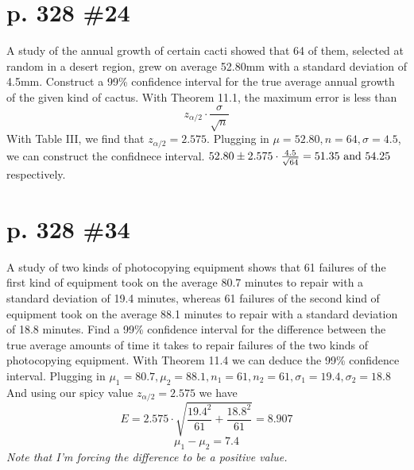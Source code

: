 \documentclass[12pt]{article}
\begin{document}
	\section[20pt]{p. 328 \#24}
	A study of the annual growth of certain cacti showed that 64 of them, selected at random in a desert region, grew on average 52.80mm with a standard deviation of 4.5mm. Construct a 99\% confidence interval for the true average annual growth of the given kind of cactus.
	\newline \newline
	With Theorem 11.1, the maximum error is less than
	\[z_{\alpha/2}\cdot \frac{\sigma}{\sqrt{n}}\]
	With Table III, we find that \(z_{\alpha/2} = 2.575\).
	\newline
	Plugging in \(\mu = 52.80, n = 64, \sigma = 4.5\), we can construct the confidnece interval.
	\(52.80 \pm 2.575\cdot \frac{4.5}{\sqrt{64}} = 51.35 \textup{ and } 54.25\) respectively.
	\newline \newline
	\newpage
	\section[20pt]{p. 328 \#34}
	A study of two kinds of photocopying equipment shows that 61 failures of the first kind of equipment took on the average 80.7 minutes to repair with a standard deviation of 19.4 minutes, whereas 61 failures of the second kind of equipment took on the average 88.1 minutes to repair with a standard deviation of 18.8 minutes. Find a 99\% confidence interval for the difference between the true average amounts of time it takes to repair failures of the two kinds of photocopying equipment.
	\newline \newline
	With Theorem 11.4 we can deduce the 99\% confidence interval.
	\newline
	Plugging in \(\mu_1 = 80.7, \mu_2 = 88.1, n_1 = 61, n_2 = 61, \sigma_1 = 19.4, \sigma_2 = 18.8\)
	\newline
	And using our spicy value \(z_{\alpha/2} = 2.575\) we have
	\[E = 2.575\cdot \sqrt{\frac{19.4^2}{61}+\frac{18.8^2}{61}} = 8.907\]
	\[\mu_1 - \mu_2 = 7.4\]
	\newline
	\newline \newline
	\textit{Note that I'm forcing the difference to be a positive value.}
	\newpage
\end{document}

